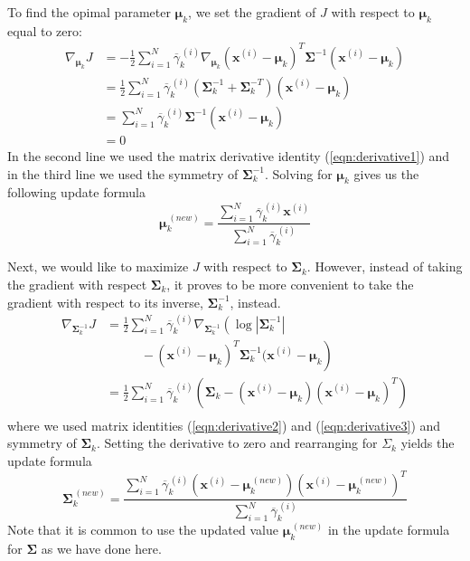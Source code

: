 \documentclass[final,3p,times,twocolumn]{elsarticle}
\let\bs\boldsymbol
\let\ol\overline
\begin{document}
To find the opimal parameter $\bs\mu_k$, we set the gradient of $J$ with respect to $\bs \mu_k$ equal to zero:
\begin{equation*}
\begin{split}
\nabla_{\bs\mu_k} J &= -\frac{1}{2}\sum_{i=1}^N \ol\gamma_k^{\,(i)} \nabla_{\bs\mu_k} (\bs x^{(i)} - \bs\mu_k)^T \bs\Sigma^{-1}(\bs x^{(i)} - \bs\mu_k)\\
&= \frac{1}{2}\sum_{i=1}^N \ol\gamma_k^{\,(i)}(\bs\Sigma_k^{-1} + \bs\Sigma_k^{-T})(\bs x^{(i)} - \bs\mu_k)\\
&= \sum_{i=1}^N\ol\gamma_k^{\,(i)} \bs\Sigma^{-1} (\bs x^{(i)} - \bs\mu_k)\\
&= 0
\end{split}
\end{equation*}
In the second line we used the matrix derivative identity (\ref{eqn:derivative1}) and in the third line we used the symmetry of $\bs\Sigma^{-1}_k$.
Solving for $\bs\mu_k$ gives us the following update formula
\begin{equation}
\label{eqn:gmmMu}
\bs\mu_k^{\,(new)} = \frac{\sum_{i=1}^N\ol\gamma_k^{\,(i)} \bs x^{(i)}}{\sum_{i=1}^N \ol\gamma_k^{\,(i)}}
\end{equation}

Next, we would like to maximize $J$ with respect to $\bs\Sigma_k$.
However, instead of taking the gradient with respect $\bs\Sigma_k$, it proves to be more convenient to take the gradient with respect to its inverse, $\bs\Sigma_k^{-1}$, instead.
\begin{equation*}
\begin{split}
\nabla_{\bs \Sigma_k^{-1}}J &= \frac{1}{2}\sum_{i=1}^N \ol\gamma_k^{\,(i)}\nabla_{\bs\Sigma_k^{-1}}\left(\log \left|\bs \Sigma_k^{-1}\right| \right.\\
&\qquad\quad\left. -\,(\bs x^{(i)} - \bs \mu_k)^T \bs\Sigma_k^{-1}(\bs x^{(i)} - \bs\mu_k\right)\\
&=\frac{1}{2}\sum_{i=1}^N \ol\gamma_k^{\,(i)}\left(\bs \Sigma_k - (\bs x^{(i)} - \bs \mu_k)(\bs x^{(i)} - \bs \mu_k)^T\right)\\
\end{split}
\end{equation*}
where we used matrix identities (\ref{eqn:derivative2}) and (\ref{eqn:derivative3}) and symmetry of $\bs\Sigma_k$.
Setting the derivative to zero and rearranging for $\Sigma_k$ yields the update formula
\begin{equation}
\label{eqn:gmmSigma}
\bs \Sigma_k^{\,(new)} = \frac{\sum_{i=1}^N \ol\gamma_k^{\,(i)}(\bs x^{(i)}-\bs\mu_k^{\,(new)})(\bs x^{(i)}-\bs\mu_k^{\,(new)})^T}{\sum_{i=1}^N \ol\gamma_k^{\,(i)}}
\end{equation}
Note that it is common to use the updated value $\bs\mu_k^{\,(new)}$ in the update formula for $\bs\Sigma$ as we have done here.
\end{document}
